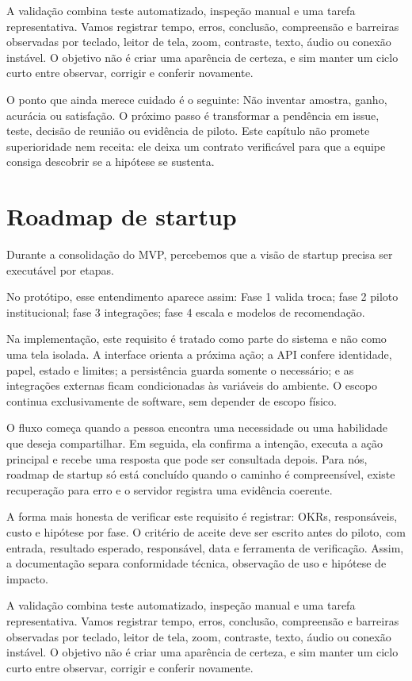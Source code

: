 \documentclass[12pt,oneside,a4paper,article]{abntex2}
\begin{document}
A validação combina teste automatizado, inspeção manual e uma tarefa representativa. Vamos registrar tempo, erros, conclusão, compreensão e barreiras observadas por teclado, leitor de tela, zoom, contraste, texto, áudio ou conexão instável. O objetivo não é criar uma aparência de certeza, e sim manter um ciclo curto entre observar, corrigir e conferir novamente.

O ponto que ainda merece cuidado é o seguinte: Não inventar amostra, ganho, acurácia ou satisfação. O próximo passo é transformar a pendência em issue, teste, decisão de reunião ou evidência de piloto. Este capítulo não promete superioridade nem receita: ele deixa um contrato verificável para que a equipe consiga descobrir se a hipótese se sustenta.

\section{Roadmap de startup}
Durante a consolidação do MVP, percebemos que a visão de startup precisa ser executável por etapas.

No protótipo, esse entendimento aparece assim: Fase 1 valida troca; fase 2 piloto institucional; fase 3 integrações; fase 4 escala e modelos de recomendação.

Na implementação, este requisito é tratado como parte do sistema e não como uma tela isolada. A interface orienta a próxima ação; a API confere identidade, papel, estado e limites; a persistência guarda somente o necessário; e as integrações externas ficam condicionadas às variáveis do ambiente. O escopo continua exclusivamente de software, sem depender de escopo físico.

O fluxo começa quando a pessoa encontra uma necessidade ou uma habilidade que deseja compartilhar. Em seguida, ela confirma a intenção, executa a ação principal e recebe uma resposta que pode ser consultada depois. Para nós, roadmap de startup só está concluído quando o caminho é compreensível, existe recuperação para erro e o servidor registra uma evidência coerente.

A forma mais honesta de verificar este requisito é registrar: OKRs, responsáveis, custo e hipótese por fase. O critério de aceite deve ser escrito antes do piloto, com entrada, resultado esperado, responsável, data e ferramenta de verificação. Assim, a documentação separa conformidade técnica, observação de uso e hipótese de impacto.

A validação combina teste automatizado, inspeção manual e uma tarefa representativa. Vamos registrar tempo, erros, conclusão, compreensão e barreiras observadas por teclado, leitor de tela, zoom, contraste, texto, áudio ou conexão instável. O objetivo não é criar uma aparência de certeza, e sim manter um ciclo curto entre observar, corrigir e conferir novamente.
\end{document}
